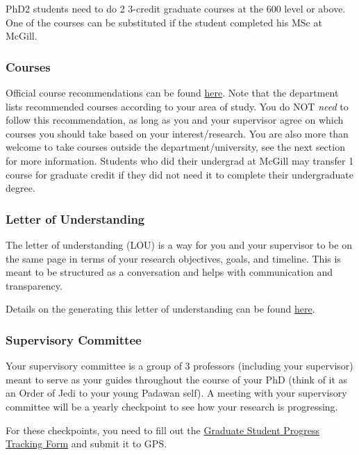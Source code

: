      PhD2 students need to do 2 3-credit graduate courses at the 600 level or above. One of the courses can be substituted if the student completed his MSc at McGill. 
    
    \subsubsection{Courses}
    
    Official course recommendations can be found \href{https://www.physics.mcgill.ca/grads/courses.html}{here}. Note that the department lists recommended courses according to your area of study. You do NOT \textit{need} to follow this recommendation, as long as you and your supervisor agree on which courses you should take based on your interest/research. You are also more than welcome to take courses outside the department/university, see the next section for more information. Students who did their undergrad at McGill may transfer 1 course for graduate credit if they did not need it to complete their undergraduate degree.

    \subsubsection{Letter of Understanding} 

    The letter of understanding (LOU) is a way for you and your supervisor to be on the same page in terms of your research objectives, goals, and timeline. This is meant to be structured as a conversation and helps with communication and transparency. 

    Details on the generating this letter of understanding can be found \href{https://www.physics.mcgill.ca/grads/lou22.pdf}{here}.

    \subsubsection{Supervisory Committee}

    Your supervisory committee is a group of 3 professors (including your supervisor) meant to serve as your guides throughout the course of your PhD (think of it as an Order of Jedi to your young Padawan self). A meeting with your supervisory committee will be a yearly checkpoint to see how your research is progressing.

    For these checkpoints, you need to fill out the \href{https://www.mcgill.ca/gps/students/progress-tracking}{Graduate Student Progress Tracking Form} and submit it to GPS. 
    
